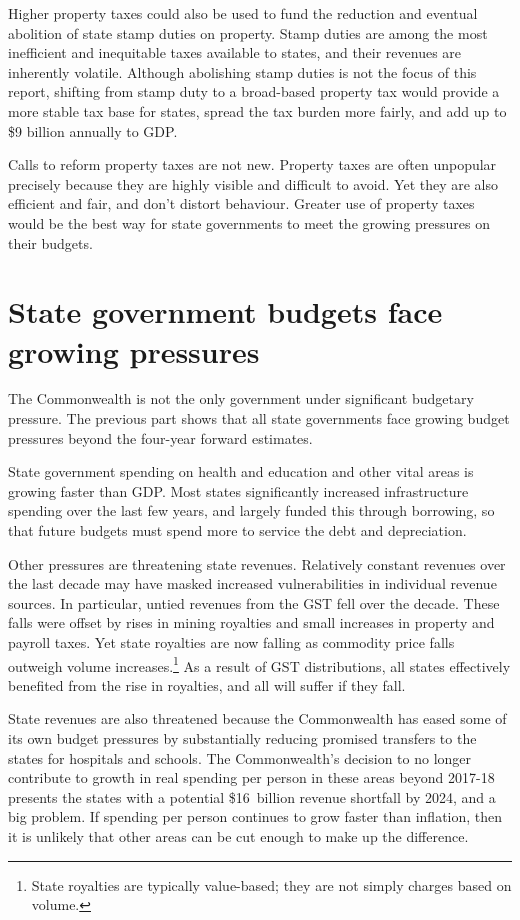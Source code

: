 \documentclass[twoside,english]{palatinob5portrait}
\begin{document}
\begin{overview}[-25pt]
Higher property taxes could also be used to fund the reduction and eventual abolition of state stamp duties on property. Stamp duties are among the most inefficient and inequitable taxes available to states, and their revenues are inherently volatile. Although abolishing stamp duties is not the focus of this report, shifting from stamp duty to a broad-based property tax would provide a more stable tax base for states, spread the tax burden more fairly, and add up to \$9 billion annually to GDP. 

Calls to reform property taxes are not new. Property taxes are often unpopular precisely because they are highly visible and difficult to avoid. Yet they are also efficient and fair, and don’t distort behaviour. Greater use of property taxes would be the best way for state governments to meet the growing pressures on their budgets.
\end{overview}
\chapter{State government budgets face growing pressures}\label{chapter:PROP-1}
The Commonwealth is not the only government under significant budgetary pressure. The previous part shows that all state governments face growing budget pressures beyond the four-year forward estimates. 

State government spending on health and education and other vital areas is growing faster than GDP\@. Most states significantly increased infrastructure spending over the last few years, and largely funded this through borrowing, so that future budgets must spend more to service the debt and depreciation. 

Other pressures are threatening state revenues. Relatively constant revenues over the last decade may have masked increased vulnerabilities in individual revenue sources. In particular, untied revenues from the GST fell over the decade.  These falls were offset by rises in mining royalties and small increases in property and payroll taxes. Yet state royalties are now falling as commodity price falls outweigh volume increases.\footnote{State royalties are typically value-based; they are not simply charges based on volume.}  As a result of GST distributions, all states effectively benefited from the rise in royalties, and all will suffer if they fall. 

State revenues are also threatened because the Commonwealth has eased some of its own budget pressures by substantially reducing promised transfers to the states for hospitals and schools. The Commonwealth’s decision to no longer contribute to growth in real spending per person in these areas beyond 2017-18 presents the states with a potential \$16~billion revenue shortfall by 2024, and a big problem.  If spending per person continues to grow faster than inflation, then it is unlikely that other areas can be cut enough to make up the difference. 
\end{document}

